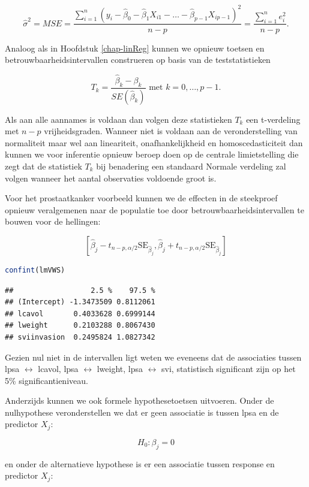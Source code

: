 \documentclass[
  12pt,dutch,coursenotes]{book}
\begin{document}
\[\hat\sigma^2=MSE=\frac{\sum\limits_{i=1}^n \left(y_i-\hat\beta_0-\hat\beta_1 X_{i1}-\ldots-\hat\beta_{p-1} X_{ip-1}\right)^2}{n-p}=\frac{\sum\limits_{i=1}^n e^2_i}{n-p}.\]

Analoog als in Hoofdstuk \ref{chap-linReg} kunnen we opnieuw toetsen en betrouwbaarheidsintervallen construeren op basis van de teststatistieken

\[T_k=\frac{\hat{\beta}_k-\beta_k}{SE(\hat{\beta}_k)} \text{ met } k=0, \ldots, p-1.\]

Als aan alle aannames is voldaan dan volgen deze statistieken \(T_k\) een t-verdeling met \(n-p\) vrijheidsgraden.
Wanneer niet is voldaan aan de veronderstelling van normaliteit maar wel aan lineariteit, onafhankelijkheid en homoscedasticiteit dan kunnen we voor inferentie opnieuw beroep doen op de centrale limietstelling die zegt dat de statistiek \(T_k\) bij benadering een standaard Normale verdeling zal volgen wanneer het aantal observaties voldoende groot is.

Voor het prostaatkanker voorbeeld kunnen we de effecten in de steekproef opnieuw veralgemenen naar de populatie toe door betrouwbaarheidsintervallen te bouwen voor de hellingen:

\[
[\hat\beta_j - t_{n-p,\alpha/2} \text{SE}_{\hat\beta_j},\hat\beta_j + t_{n-p,\alpha/2} \text{SE}_{\hat\beta_j}]
\]

\begin{lstlisting}[language=R]
confint(lmVWS)
\end{lstlisting}

\begin{lstlisting}
##                  2.5 %    97.5 %
## (Intercept) -1.3473509 0.8112061
## lcavol       0.4033628 0.6999144
## lweight      0.2103288 0.8067430
## sviinvasion  0.2495824 1.0827342
\end{lstlisting}

Gezien nul niet in de intervallen ligt weten we eveneens dat de associaties tussen lpsa \(\leftrightarrow\) lcavol, lpsa \(\leftrightarrow\) lweight, lpsa \(\leftrightarrow\) svi, statistisch significant zijn op het 5\% significantieniveau.

Anderzijds kunnen we ook formele hypothesetoetsen uitvoeren. Onder de nulhypothese veronderstellen we dat er geen associatie is tussen lpsa en de predictor \(X_j\):

\[H_0: \beta_j=0\]

en onder de alternatieve hypothese is er een associatie tussen response en predictor \(X_j\):
\end{document}

